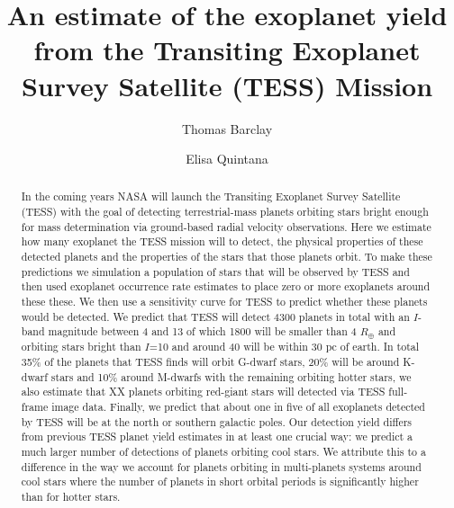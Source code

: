 \documentclass[iop,apj]{emulateapj}
\begin{document}
\title{An estimate of the exoplanet yield from the Transiting Exoplanet Survey Satellite (TESS) Mission}






 \author{Thomas Barclay}
 \author{Elisa Quintana}


\begin{abstract}
In the coming years NASA will launch the Transiting Exoplanet Survey Satellite (TESS) with the goal of detecting terrestrial-mass planets orbiting stars bright enough for mass determination via ground-based radial velocity observations. Here we estimate how many exoplanet the TESS mission will to detect, the physical properties of these detected planets and the properties of the stars that those planets orbit. To make these predictions we simulation a population of stars that will be observed by TESS and then used exoplanet occurrence rate estimates to place zero or more exoplanets around these these. We then use a sensitivity curve for TESS to predict whether these planets would be detected. We predict that TESS will detect 4300 planets in total with an $I$-band magnitude between 4 and 13 of which 1800 will be smaller than 4 $R_\oplus$ and orbiting stars bright than $I$=10 and around 40 will be within 30 pc of earth. In total 35\% of the planets that TESS finds will orbit G-dwarf stars, 20\% will be around K-dwarf stars and 10\% around M-dwarfs with the remaining orbiting hotter stars, we also estimate that XX planets orbiting red-giant stars will detected via TESS full-frame image data.  Finally, we predict that about one in five of all exoplanets detected by TESS will be at the north or southern galactic poles. Our detection yield differs from previous TESS planet yield estimates in at least one crucial way: we predict a much larger number of detections of planets orbiting cool stars. We attribute this to a difference in the way we account for planets orbiting in multi-planets systems around cool stars where the number of planets in short orbital periods is significantly higher than for hotter stars.
\end{abstract}
\end{document}
